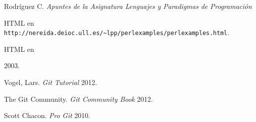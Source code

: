 \documentclass[11pt,a4paper]{article}
\begin{document}
\begin{thebibliography}{99}
 Rodríguez C.  \emph{Apuntes de la Asignatura Lenguajes y Paradigmas de Programación }\\ 
    \begin{latexonly}
    HTML en \verb|http://nereida.deioc.ull.es/~lpp/perlexamples/perlexamples.html|.\\
    \end{latexonly}
    \begin{htmlonly}
    HTML en \\
    \end{htmlonly}
    2003.

 Vogel, Lars.  \emph{Git Tutorial}
    2012.

 The Git Community.  \emph{Git Community Book}
    2012.

 Scott Chacon.  \emph{Pro Git}
    2010.

%


\end{thebibliography}
\end{document}
